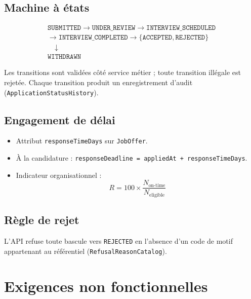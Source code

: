 \documentclass[12pt,a4paper,oneside]{report}
\begin{document}
\section{Machine à états}

\[
\begin{array}{c}
\texttt{SUBMITTED} \rightarrow \texttt{UNDER\_REVIEW} \rightarrow \texttt{INTERVIEW\_SCHEDULED}\\
\rightarrow \texttt{INTERVIEW\_COMPLETED} \rightarrow \{\texttt{ACCEPTED},\texttt{REJECTED}\}\\
\quad\downarrow\\
\texttt{WITHDRAWN}
\end{array}
\]

Les transitions sont validées côté service métier ; toute transition illégale est rejetée. Chaque transition produit un enregistrement d'audit (\texttt{ApplicationStatusHistory}).

\section{Engagement de délai}

\begin{itemize}[leftmargin=1.4em]
  \item Attribut \texttt{responseTimeDays} sur \texttt{JobOffer}.
  \item À la candidature : \texttt{responseDeadline = appliedAt + responseTimeDays}.
  \item Indicateur organisationnel :
  \[
  R = 100 \times \frac{N_{\mathrm{on\text{-}time}}}{N_{\mathrm{eligible}}}
  \]
\end{itemize}

\section{Règle de rejet}

L'API refuse toute bascule vers \texttt{REJECTED} en l'absence d'un code de motif appartenant au référentiel (\texttt{RefusalReasonCatalog}).

\chapter{Exigences non fonctionnelles}
\label{ch:nfr}
\end{document}
